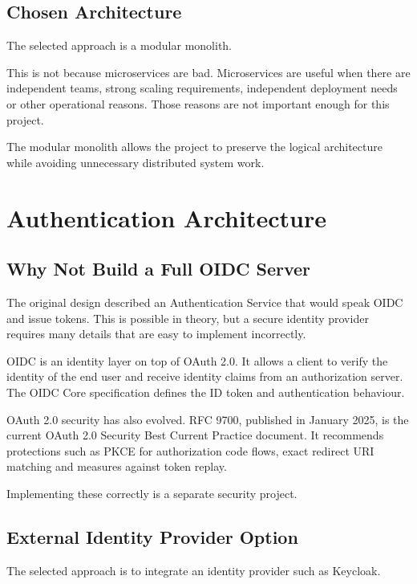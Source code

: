 \documentclass[11pt,a4paper]{article}
\begin{document}
\subsection{Chosen Architecture}

The selected approach is a modular monolith.

This is not because microservices are bad. Microservices are useful when there are independent teams, strong scaling requirements, independent deployment needs or other operational reasons. Those reasons are not important enough for this project.

The modular monolith allows the project to preserve the logical architecture while avoiding unnecessary distributed system work.

\section{Authentication Architecture}

\subsection{Why Not Build a Full OIDC Server}

The original design described an Authentication Service that would speak OIDC and issue tokens. This is possible in theory, but a secure identity provider requires many details that are easy to implement incorrectly.

OIDC is an identity layer on top of OAuth 2.0. It allows a client to verify the identity of the end user and receive identity claims from an authorization server. The OIDC Core specification defines the ID token and authentication behaviour.

OAuth 2.0 security has also evolved. RFC 9700, published in January 2025, is the current OAuth 2.0 Security Best Current Practice document. It recommends protections such as PKCE for authorization code flows, exact redirect URI matching and measures against token replay. \cite{rfc9700}

Implementing these correctly is a separate security project.

\subsection{External Identity Provider Option}

The selected approach is to integrate an identity provider such as Keycloak.
\end{document}
